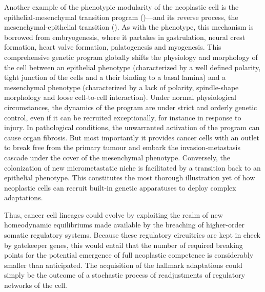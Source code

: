 Another example of the phenotypic modularity of the neoplastic cell is the
epithelial-mesenchymal transition program ()---and its reverse
process, the mesenchymal-epithelial transition ().  As with the
 phenotype, this mechanism is borrowed from embryogenesis, where
it partakes in gastrulation, neural crest formation, heart valve formation,
palatogenesis and myogenesis.\cite{thiery_epithelial-mesenchymal_2009} This
comprehensive genetic program globally shifts the physiology and morphology of
the cell between an epithelial phenotype (characterized by a well defined
polarity, tight junction of the cells and a their binding to a basal lamina) and
a mesenchymal phenotype (characterized by a lack of polarity, spindle-shape
morphology and loose cell-to-cell interaction).\cite{thiery_complex_2006} Under
normal physiological circumstances, the dynamics of the 
program are under strict and orderly genetic control, even if it can be
recruited exceptionally, for instance in response to injury.  In pathological
conditions, the unwarranted activation of the  program can
cause organ fibrosis.  But most importantly it provides cancer cells with an
outlet to break free from the primary tumour and embark the invasion-metastasis
cascade under the cover of the mesenchymal phenotype.  Conversely, the
colonization of new micrometastatic niche is facilitated by a transition back to
an epithelial phenotype.  This constitutes the most thorough illustration yet of
how neoplastic cells can recruit built-in genetic apparatuses to deploy complex
adaptations.

Thus, cancer cell lineages could evolve by exploiting the realm of new
homeodynamic equilibriums made available by the breaching of higher-order
somatic regulatory systems.  Because these regulatory circuitries are kept in
check by gatekeeper genes, this would entail that the number of required
breaking points for the potential emergence of full neoplastic competence is
considerably smaller than anticipated. The acquisition of the hallmark
adaptations could simply be the outcome of a stochastic process of readjustments
of regulatory networks of the cell.

